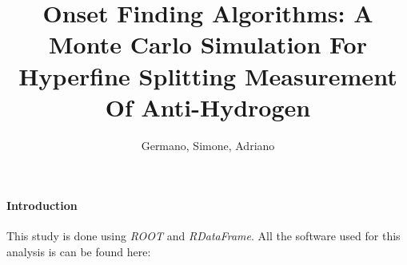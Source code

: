 \documentclass[11pt,a4paper,oneside]{article}
\title{%
 \vspace{-2.0cm}
 Onset Finding Algorithms: A Monte Carlo Simulation For Hyperfine Splitting Measurement Of Anti-Hydrogen
}
\date{\vspace{-5ex}}
\author{Germano, Simone, Adriano}
\begin{document}

\maketitle
\begin{abstract}
\centering

\end{abstract}

\paragraph{Introduction}
This study is done using \textit{ROOT} and \textit{RDataFrame}. All the software used for this analysis is can be found here: {}
\end{document}

